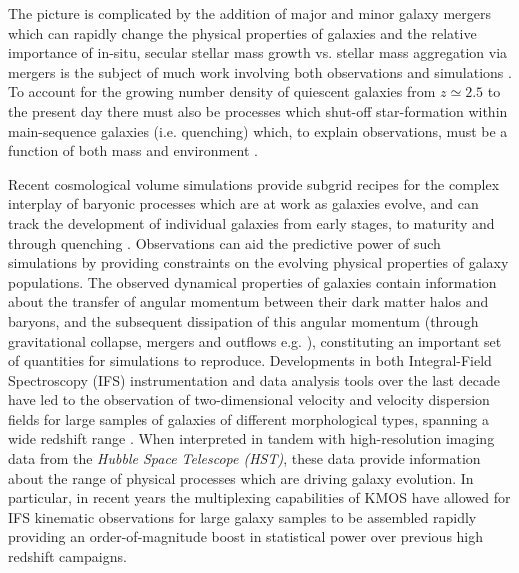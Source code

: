 \documentclass[fleqn,usenatbib]{mnras}
\begin{document}
The picture is complicated by the addition of major and minor galaxy mergers which can rapidly change the physical properties of galaxies \citep[e.g.][]{Toomre1977,Lotz2008,Conselice2011,Conselice2014} and the relative importance of in-situ, secular stellar mass growth vs. stellar mass aggregation via mergers is the subject of much work involving both observations and simulations \citep[e.g.][]{Robaina2009,Kaviraj2012,Stott2013,Lofthouse2017,Qu2017}. 
To account for the growing number density of quiescent galaxies from $z\simeq2.5$ to the present day \citep[e.g.][]{Bell2004,Faber2007,Brown2007,Ilbert2010,Brammer2011,Muzzin2013,Buitrago2013} there must also be processes which shut-off star-formation within main-sequence galaxies (i.e. quenching) which, to explain observations, must be a function of both mass and environment \citep{Peng2010,Darvish2016}.

Recent cosmological volume simulations provide subgrid recipes for the complex interplay of baryonic processes which are at work as galaxies evolve, and can track the development of individual galaxies from early stages, to maturity and through quenching \citep{Dubois2014,Vogelsberger2014b,Schaye2015}.
Observations can aid the predictive power of such simulations by providing constraints on the evolving physical properties of galaxy populations.
The observed dynamical properties of galaxies contain information about the transfer of angular momentum between their dark matter halos and baryons, and the subsequent dissipation of this angular momentum (through gravitational collapse, mergers and outflows e.g. \citealt{Fall1983,Romanowsky2012,Fall2013}), constituting an important set of quantities for simulations to reproduce.
Developments in both Integral-Field Spectroscopy (IFS) instrumentation and data analysis tools over the last decade have led to the observation of two-dimensional velocity and velocity dispersion fields for large samples of galaxies of different morphological types, spanning a wide redshift range \citep[e.g.][]{Sarzi2005,Flores2006,Epinat2008,ForsterSchreiber2009,Cappellari2011,Gnerucci2011,Epinat2012,Croom2012,Swinbank2012,Swinbank2012a,Bundy2015,Wisnioski2015,Stott2016,Harrison2017,Swinbank2017}.
When interpreted in tandem with high-resolution imaging data from the {\it Hubble Space Telescope (HST)}, these data provide information about the range of physical processes which are driving galaxy evolution.
In particular, in recent years the multiplexing capabilities of KMOS \citep{Sharples2013} have allowed for IFS kinematic observations for large galaxy samples to be assembled rapidly \citep{Sobral2013,Wisnioski2015,Stott2016,Mason2017,Harrison2017} providing an order-of-magnitude boost in statistical power over previous high redshift campaigns.    
\end{document}
